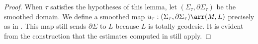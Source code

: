 \begin{lemma}
\begin{proof}
When $\tau$ satisfies the hypotheses of this lemma, let $(\Sigma_\tau,\partial\Sigma_\tau)$ be the smoothed domain. We define a smoothed map $u_\tau:(\Sigma_\tau,\partial\Sigma_\tau)\arr(M,L)$ precisely as in \cite{dw}. This map still sends $\partial\Sigma$ to $L$ because $L$ is totally geodesic. It is evident from the construction that the estimates computed in \cite{dw} still apply.
\end{proof}
\end{lemma}
